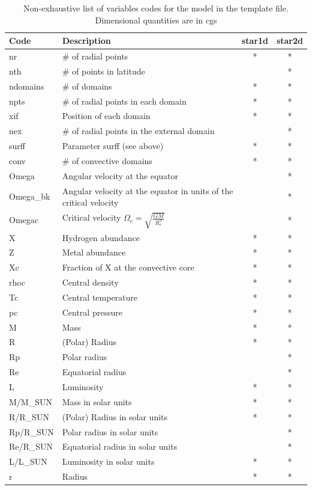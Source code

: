 \begin{longtable}{|l|p{8cm}|c|c|}
\caption{Non-exhaustive list of variables codes for the model in the template
file. Dimensional quantities are in cgs}\\
\hline
\bf Code&\bf Description&\bf star1d&\bf star2d\\
\hline\hline
nr&\# of radial points&*&*\\
\hline
nth&\# of points in latitude&&*\\
\hline
ndomains&\# of domains&*&*\\
\hline
npts&\# of radial points in each domain&*&*\\
\hline
xif&Position of each domain&*&*\\
\hline
nex&\# of radial points in the external domain&&*\\
\hline
surff&Parameter surff (see above)&*&*\\
\hline
conv&\# of convective domains&*&*\\
\hline
Omega&Angular velocity at the equator&&*\\
\hline
Omega\_bk&Angular velocity at the equator in units of the critical velocity&&*\\
\hline
Omegac&Critical velocity $\Omega_c=\sqrt{\frac{GM}{R_e^3}}$&&*\\
\hline
X&Hydrogen abundance&*&*\\
\hline
Z&Metal abundance&*&*\\
\hline
Xc&Fraction of X at the convective core&*&*\\
\hline
rhoc&Central density&*&*\\
\hline
Tc&Central temperature&*&*\\
\hline
pc&Central pressure&*&*\\
\hline
M&Mass&*&*\\
\hline
R&(Polar) Radius&*&*\\
\hline
Rp&Polar radius&&*\\
\hline
Re&Equatorial radius&&*\\
\hline
L&Luminosity&*&*\\
\hline
M/M\_SUN&Mass in solar units&*&*\\
\hline
R/R\_SUN&(Polar) Radius in solar units&*&*\\
\hline
Rp/R\_SUN&Polar radius in solar units&&*\\
\hline
Re/R\_SUN&Equatorial radius in solar units&&*\\
\hline
L/L\_SUN&Luminosity in solar units&*&*\\
\hline
r&Radius&*&*\\

\end{longtable}
